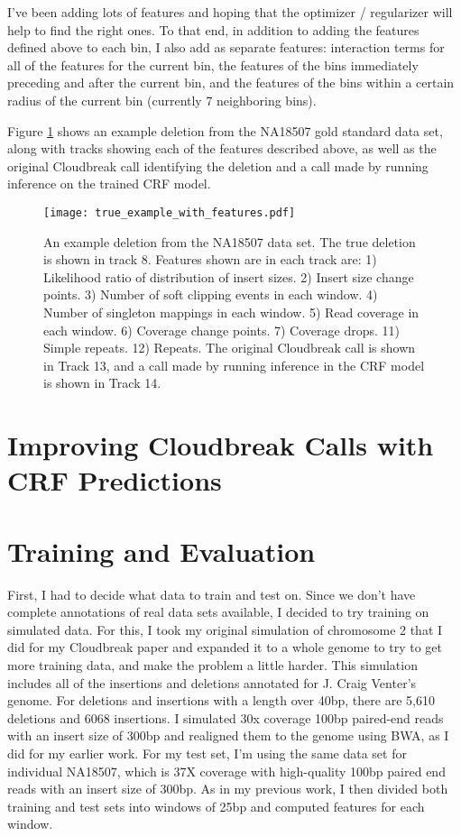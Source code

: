 I've been adding lots of features and hoping that the optimizer / regularizer will help to find the right ones. To that end, in addition to adding the features defined above to each bin, I also add as separate features: interaction terms for all of the features for the current bin, the features of the bins immediately preceding and after the current bin, and the features of the bins within a certain radius of the current bin (currently 7 neighboring bins).

Figure \ref{crf_features_example} shows an example deletion from the NA18507 gold standard data set, along with tracks showing each of the features described above, as well as the original Cloudbreak call identifying the deletion and a call made by running inference on the trained CRF model.

\begin{figure}
\centering
\texttt{[image: true\_example\_with\_features.pdf]}
\caption{An example deletion from the NA18507 data set. The true deletion is shown in track 8. Features shown are in each track are: 1) Likelihood ratio of distribution of insert sizes. 2) Insert size change points. 3) Number of soft clipping events in each window. 4) Number of singleton mappings in each window. 5) Read coverage in each window. 6) Coverage change points. 7) Coverage drops. 11) Simple repeats. 12) Repeats. The original Cloudbreak call is shown in Track 13, and a call made by running inference in the CRF model is shown in Track 14.}
\label{crf_features_example}
\end{figure}


\section{Improving Cloudbreak Calls with CRF Predictions}

\section{Training and Evaluation}
First, I had to decide what data to train and test on. Since we don't have complete annotations of real data sets available, I decided to try training on simulated data. For this, I took my original simulation of chromosome 2 that I did for my Cloudbreak paper and expanded it to a whole genome to try to get more training data, and make the problem a little harder. This simulation includes all of the insertions and deletions annotated for J. Craig Venter's genome. For deletions and insertions with a length over 40bp, there are 5,610 deletions and 6068 insertions. I simulated 30x coverage 100bp paired-end reads with an insert size of 300bp and realigned them to the genome using BWA, as I did for my earlier work. For my test set, I'm using the same data set for individual NA18507, which is 37X coverage with high-quality 100bp paired end reads with an insert size of 300bp. As in my previous work, I then divided both training and test sets into windows of 25bp and computed features for each window.

